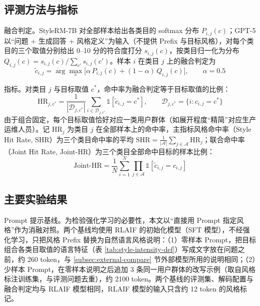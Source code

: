 \documentclass[fontset=fandol,type=master,campus=shenzhen,etitleauto=true]{hithesisbook}
\begin{document}
\subsection{评测方法与指标}\label{ux7efcux5408ux8bc4ux6d4bux6307ux6807}

融合判定。StyleRM-7B 对全部样本给出各类目的 softmax 分布 $P_{i,j}(c)$；GPT-5 以“问题 + 生成回答 + 风格定义”为输入（不提供 Prefix 与目标风格），对每个类目的三个取值分别给出 0--10 分的符合度打分 $s_{i,j}(c)$，按类目归一化为分布 $Q_{i,j}(c) = s_{i,j}(c) / \sum_{c'} s_{i,j}(c')$。样本 $i$ 在类目 $j$ 上的融合判定为
\begin{equation}\label{eq:fused-level}
\tilde{c}_{i,j} = \arg\max_{c} \bigl[ \alpha\, P_{i,j}(c) + (1 - \alpha)\, Q_{i,j}(c) \bigr], \qquad \alpha = 0.5
\end{equation}

指标。对类目 $j$ 与目标取值 $c^*$，命中率为融合判定等于目标取值的比例：
\begin{equation}
\text{HR}_{j,c^*} = \frac{1}{|\mathcal{D}_{j,c^*}|} \sum_{i \in \mathcal{D}_{j,c^*}} \mathbb{1}\!\left[\tilde{c}_{i,j} = c^*\right], \qquad \mathcal{D}_{j,c^*} = \{ i : c_{i,j} = c^* \}
\end{equation}
由于组合固定，每个目标取值恰好对应一类用户群体（如展开程度“精简”对应生产运维人员）。记 $\text{HR}_j$ 为类目 $j$ 在全部样本上的命中率，主指标风格命中率（Style Hit Rate, SHR）为三个类目命中率的平均 $\text{SHR} = \frac{1}{|\mathcal{A}|}\sum_{j \in \mathcal{A}} \text{HR}_j$；联合命中率（Joint Hit Rate, Joint-HR）为三个类目全部命中目标的样本比例：
\begin{equation}\label{eq:joint-ihr}
\text{Joint-HR} = \frac{1}{N} \sum_{i=1}^{N} \prod_{j \in \mathcal{A}} \mathbb{1}\!\left[\tilde{c}_{i,j} = c_{i,j}\right]
\end{equation}

\subsection{主要实验结果}\label{ux4e3bux8981ux7ed3ux679c-1}

Prompt 提示基线。为检验强化学习的必要性，本文以“直接用 Prompt 指定风格”作为消融对照。两个基线均使用 RLAIF 的初始化模型（SFT 模型），不经强化学习，只把风格 Prefix 替换为自然语言风格说明：（1）零样本 Prompt，把目标组合各类目取值的语言特征（表 \ref{tab:style-intensity-def}）写成文字放在问题之前，约 260 token，与 \ref{subsec:external-compare} 节外部模型所用的说明相同；（2）少样本 Prompt，在零样本说明之后追加 3 条同一用户群体的改写示例（取自风格标注训练集，与评测问题去重），约 2100 token。两个基线的评测集、解码配置与融合判定均与 RLAIF 模型相同，RLAIF 模型的输入只含约 12 token 的风格标记。
\end{document}
